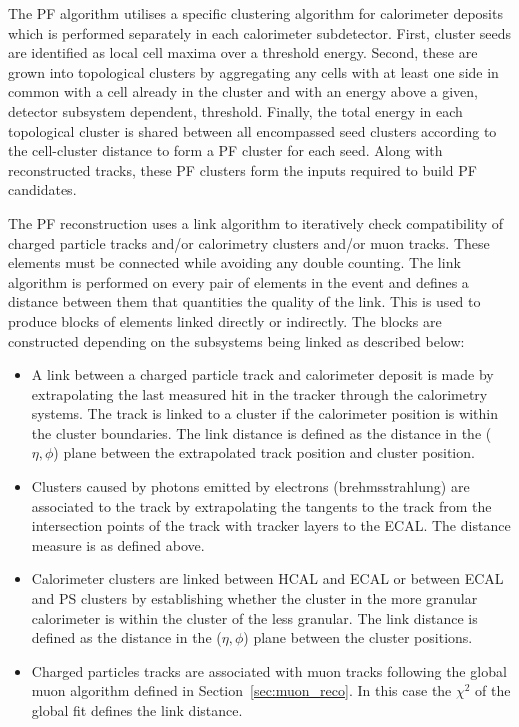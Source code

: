 The PF algorithm utilises a specific clustering algorithm for calorimeter deposits which is performed separately 
in each calorimeter subdetector. First, cluster seeds are identified as local cell maxima over a threshold energy.
Second, these are grown into topological clusters by aggregating any cells with at least one side in common with
a cell already in the cluster and with an energy above a given, detector
subsystem dependent, threshold. Finally, the total energy in each topological cluster
is shared between all encompassed seed clusters according to the cell-cluster distance to 
form a PF cluster for each seed. Along with reconstructed tracks, these PF clusters form the inputs 
required to build PF candidates.

The PF reconstruction uses a link algorithm to iteratively check compatibility of charged particle tracks 
and/or calorimetry clusters and/or muon tracks. These elements must be connected while avoiding any double counting. 
The link algorithm is performed on every pair of elements in the event and defines a distance between them
that quantities the quality of the link. This is used to produce blocks of elements linked directly 
or indirectly. The blocks are constructed depending on the subsystems being linked as described below:

\begin{itemize}
\item A link between a charged particle track and calorimeter deposit is made by extrapolating the last measured
hit in the tracker through the calorimetry systems. The track is linked to a cluster if the calorimeter position
is within the cluster boundaries. The link distance is defined as the distance in the ($\eta,\phi$) plane between
the extrapolated track position and cluster position.
\item Clusters caused by photons emitted by electrons (brehmsstrahlung) are associated to the track by extrapolating
the tangents to the track from the intersection points of the track with tracker layers to the ECAL. The distance measure
is as defined above.
\item Calorimeter clusters are linked between HCAL and ECAL or between ECAL and PS clusters by establishing whether
the cluster in the more granular calorimeter is within the cluster of the less granular. The link distance is defined
as the distance in the ($\eta,\phi$) plane between the cluster positions.
\item Charged particles tracks are associated with muon tracks following the global muon algorithm defined in 
Section~\ref{sec:muon_reco}. In this case the $\chi^2$ of the global fit defines the link distance.
\end{itemize}

